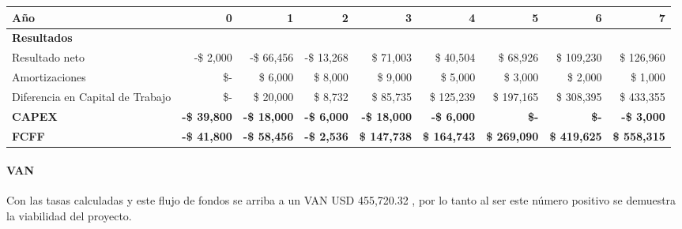 \begin{center}
\footnotesize
\begin{adjustbox}{width=\textwidth,center}
\begin{tabular}{l|rrrrrrrr}
\hline
\textbf{Año} & \textbf{0} & \textbf{1} & \textbf{2} & \textbf{3} & \textbf{4} & \textbf{5} & \textbf{6} & \textbf{7} \\
\hline
\multicolumn{9}{l}{\textbf{Resultados}} \\
\hline
Resultado neto & -\$ 2,000 & -\$ 66,456 & -\$ 13,268 & \$ 71,003 & \$ 40,504 & \$ 68,926 & \$ 109,230 & \$ 126,960 \\
\hline
Amortizaciones & \$- & \$ 6,000 & \$ 8,000 & \$ 9,000 & \$ 5,000 & \$ 3,000 & \$ 2,000 & \$ 1,000 \\
\hline
Diferencia en Capital de Trabajo & \$- & \$ 20,000 & \$ 8,732 & \$ 85,735 & \$ 125,239 & \$ 197,165 & \$ 308,395 & \$ 433,355 \\
\hline
\textbf{CAPEX} & \textbf{-\$ 39,800} & \textbf{-\$ 18,000} & \textbf{-\$ 6,000} & \textbf{-\$ 18,000} & \textbf{-\$ 6,000} & \textbf{\$-} & \textbf{\$-} & \textbf{-\$ 3,000} \\
\hline
\textbf{FCFF} & \textbf{-\$ 41,800} & \textbf{-\$ 58,456} & \textbf{-\$ 2,536} & \textbf{\$ 147,738} & \textbf{\$ 164,743} & \textbf{\$ 269,090} & \textbf{\$ 419,625} & \textbf{\$ 558,315} \\
\hline
\end{tabular}
\end{adjustbox}
\end{center}

\paragraph{VAN}

Con las tasas calculadas y este flujo de fondos se arriba a un VAN USD 455,720.32 , por lo tanto al ser este número positivo se demuestra la viabilidad del proyecto. 

